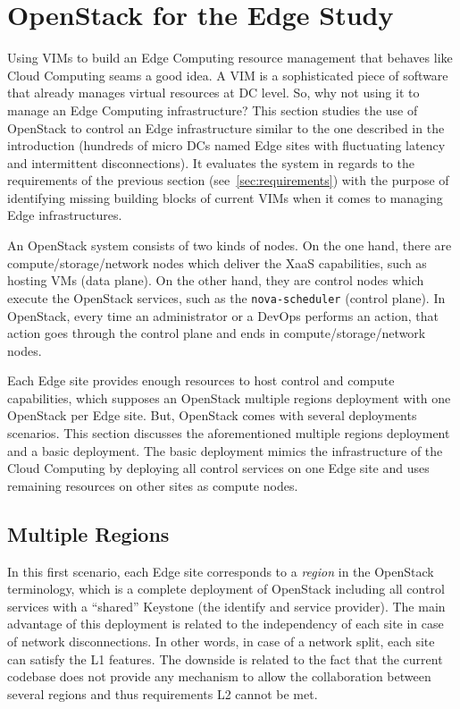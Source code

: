 \section{OpenStack for the Edge Study}
\label{sec:system_design_considerations}
Using VIMs to build an Edge Computing resource management that behaves
like Cloud Computing seams a good idea. A VIM is a sophisticated piece
of software that already manages virtual resources at DC level. So,
why not using it to manage an Edge Computing infrastructure? This
section studies the use of OpenStack to control an Edge infrastructure
similar to the one described in the introduction (hundreds of micro
DCs named Edge sites with fluctuating latency and intermittent
disconnections). It evaluates the system in regards to the
requirements of the previous section (see~\ref{sec:requirements}) with
the purpose of identifying missing building blocks of current VIMs
when it comes to managing Edge infrastructures.

An OpenStack system consists of two kinds of nodes. On the one hand,
there are compute/storage/network nodes which deliver the XaaS
capabilities, such as hosting VMs (\ie data plane). On the other
hand, they are control nodes which execute the OpenStack services,
such as the \verb|nova-scheduler| (\ie control plane). In OpenStack,
every time an administrator or a DevOps performs an action, that
action goes through the control plane and ends in
compute/storage/network nodes.

Each Edge site provides enough resources to host control and compute
capabilities, which supposes an OpenStack multiple regions deployment
with one OpenStack per Edge site. But, OpenStack comes with several
deployments scenarios. This section discusses the aforementioned
multiple regions deployment and a basic deployment. The basic
deployment mimics the infrastructure of the Cloud Computing by
deploying all control services on one Edge site and uses remaining
resources on other sites as compute nodes.

\subsection{Multiple Regions}
In this first scenario, each Edge site corresponds to a \emph{region}
in the OpenStack terminology, which is a complete deployment of
OpenStack including all control services with a ``shared'' Keystone
(\ie the identify and service provider). The main advantage of this
deployment is related to the independency of each site in case of
network disconnections. In other words, in case of a network split,
each site can satisfy the L1 features. The downside is related to the
fact that the current codebase does not provide any mechanism to allow
the collaboration between several regions and thus requirements L2
cannot be met.

